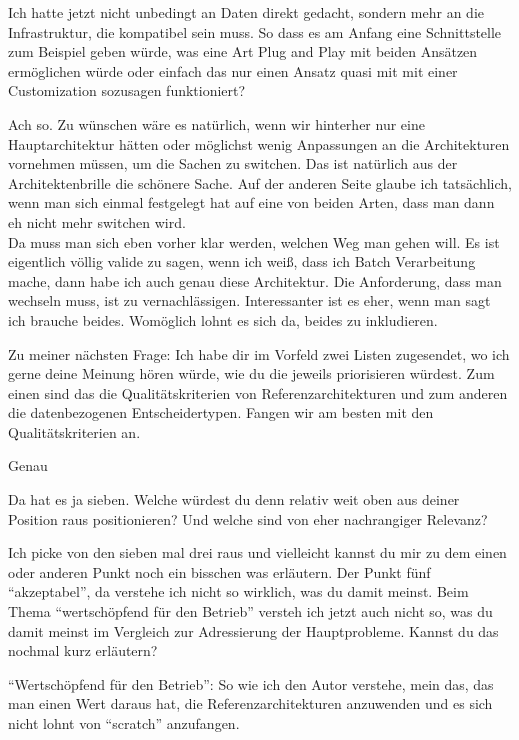 \LF	 Ich hatte jetzt nicht unbedingt an Daten direkt gedacht, sondern mehr an die Infrastruktur, die kompatibel sein muss. So dass es am Anfang eine Schnittstelle zum Beispiel geben würde, was eine Art Plug and Play mit beiden Ansätzen ermöglichen würde oder einfach das nur einen Ansatz quasi mit mit einer Customization sozusagen funktioniert?

\PA	Ach so. Zu wünschen wäre es natürlich, wenn wir hinterher nur eine Hauptarchitektur hätten oder möglichst wenig Anpassungen an die Architekturen vornehmen müssen, um die Sachen zu switchen. Das ist natürlich aus der Architektenbrille die schönere Sache. Auf der anderen Seite glaube ich tatsächlich, wenn man sich einmal festgelegt hat auf eine von beiden Arten, dass man dann eh nicht mehr switchen wird. \\
Da muss man sich eben vorher klar werden, welchen Weg man gehen will. Es ist eigentlich völlig valide zu sagen, wenn ich weiß, dass ich Batch Verarbeitung mache, dann habe ich auch genau diese Architektur. Die Anforderung, dass man wechseln muss, ist zu vernachlässigen. Interessanter ist es eher, wenn man sagt ich brauche beides. Womöglich lohnt es sich da, beides zu inkludieren.

\LF	 Zu meiner nächsten Frage: Ich habe dir im Vorfeld zwei Listen zugesendet, wo ich gerne deine Meinung hören würde, wie du die jeweils priorisieren würdest. Zum einen sind das die Qualitätskriterien von Referenzarchitekturen und zum anderen die datenbezogenen Entscheidertypen. Fangen wir am besten mit den Qualitätskriterien an.

\PA	 Genau

\LF	Da hat es ja sieben. Welche würdest du denn relativ weit oben aus deiner Position raus positionieren? Und welche sind von eher nachrangiger Relevanz?

\PA	Ich picke von den sieben mal drei raus und vielleicht kannst du mir zu dem einen oder anderen Punkt noch ein bisschen was erläutern. Der Punkt fünf \enquote{akzeptabel}, da verstehe ich nicht so wirklich, was du damit meinst. Beim  Thema \enquote{wertschöpfend für den Betrieb} versteh ich jetzt auch nicht so, was du damit meinst im Vergleich zur Adressierung der Hauptprobleme. Kannst du das nochmal kurz erläutern?

\LF	\enquote{Wertschöpfend für den Betrieb}: So wie ich den Autor verstehe, mein das, das man einen Wert daraus hat, die Referenzarchitekturen anzuwenden und es sich nicht lohnt von \enquote{scratch} anzufangen.

